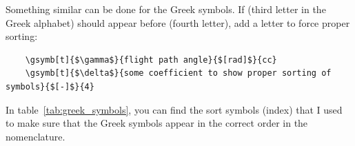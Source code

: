                 Something similar can be done for the Greek symbols. If  (third letter in the Greek alphabet) should appear before  (fourth letter), add a letter to force proper sorting:
                \begin{small}%
                \begin{verbatim}
    \gsymb[t]{$\gamma$}{flight path angle}{$[rad]$}{cc}
    \gsymb[t]{$\delta$}{some coefficient to show proper sorting of symbols}{$[-]$}{4}
                \end{verbatim}%
                \end{small}%
                In table~\ref{tab:greek_symbols}, you can find the sort symbols (index) that I used to make sure that the Greek symbols appear in the correct order in the nomenclature.
